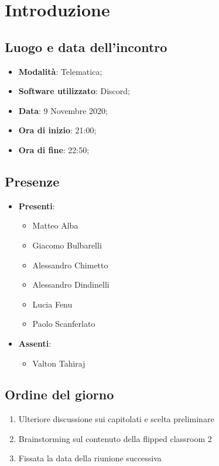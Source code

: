 \documentclass[]{article}
\begin{document}
	
	
	
	\newpage


	\section{Introduzione}
		\subsection{Luogo e data dell'incontro}
		\begin{itemize}
			\item \textbf{Modalità}: Telematica;
			\item \textbf{Software utilizzato}: Discord;
			\item \textbf{Data}: 9 Novembre 2020;
			\item \textbf{Ora di inizio}: 21:00;
			\item \textbf{Ora di fine}: 22:50;
		\end{itemize}
		
		\subsection{Presenze}
		\begin{itemize}
			\item \textbf{Presenti}: 
			\begin{itemize}
				\item Matteo Alba
				\item Giacomo Bulbarelli
				\item Alessandro Chimetto
				\item Alessandro Dindinelli
				\item Lucia Fenu
				\item Paolo Scanferlato
			\end{itemize}
			\item \textbf{Assenti}: 
			\begin{itemize}
				\item Valton Tahiraj
			\end{itemize}
		\end{itemize}
		
		
		\subsection{Ordine del giorno}
		\begin{enumerate}
			\item Ulteriore discussione sui capitolati e scelta preliminare
			\item Brainstorming sul contenuto della flipped classroom 2
			\item Fissata la data della riunione successiva
		\end{enumerate}
\end{document}
